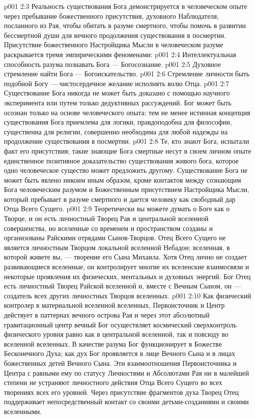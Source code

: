 \vs p001 2:3 \pc Реальность существования Бога демонстрируется в человеческом опыте через пребывание божественного присутствия, духовного Наблюдателя, посланного из Рая, чтобы обитать в разуме смертного, чтобы помочь в развитии бессмертной души для вечного продолжения существования в посмертии. Присутствие божественного Настройщика Мысли в человеческом разуме раскрывается тремя эмпирическими феноменами:
\vs p001 2:4 \bibnobreakspace Интеллектуальная способность разума познавать Бога --- Богосознание.
\vs p001 2:5 \bibnobreakspace Духовное стремление найти Бога --- Богоискательство.
\vs p001 2:6 \bibnobreakspace Стремление личности быть подобной Богу --- чистосердечное желание исполнять волю Отца.
\vs p001 2:7 \pc Существование Бога никогда не может быть доказано с помощью научного эксперимента или путем только дедуктивных рассуждений. Бог может быть осознан только на основе человеческого опыта; тем не менее истинная концепция существования Бога приемлема для логики, правдоподобна для философии, существенна для религии, совершенно необходима для любой надежды на продолжение существования в посмертии.
\vs p001 2:8 Те, кто знают Бога, испытали факт его присутствия; такие знающие Бога смертные несут в своем личном опыте единственное позитивное доказательство существования живого бога, которое одно человеческое существо может предложить другому. Существование Бога не может быть явлено никоим иным образом, кроме контактов между сознающим Бога человеческим разумом и Божественным присутствием Настройщика Мысли, который пребывает в разуме смертного и дается человеку как свободный дар Отца Всего Сущего.
\vs p001 2:9 \pc Теоретически вы можете думать о Боге как о Творце, и он есть личностный Творец Рая и центральной вселенной совершенства, но вселенные со временем и пространством созданы и организованы Райскими отрядами Сынов\hyp{}Творцов. Отец Всего Сущего не является личностным Творцом локальной вселенной Небадон; вселенная, в которой живете вы, --- творение его Сына Михаила. Хотя Отец лично не создает развивающиеся вселенные, он контролирует многие их вселенские взаимосвязи и некоторые проявления их физических, ментальных и духовных энергий. Бог Отец есть личностный Творец Райской вселенной и, вместе с Вечным Сыном, он --- создатель всех других личностных Творцов вселенных.
\vs p001 2:10 \pc Как физический контролер в материальной вселенной вселенных, Первоисточник и Центр действует в паттернах вечного острова Рая и через этот абсолютный гравитационный центр вечный Бог осуществляет космический сверхконтроль физического уровня равно как в центральной вселенной, так и повсюду во вселенной вселенных. В качестве разума Бог функционирует в Божестве Бесконечного Духа; как дух Бог проявляется в лице Вечного Сына и в лицах божественных детей Вечного Сына. Эти взаимоотношения Первоисточника и Центра с равными ему по статусу Личностями и Абсолютами Рая ни в малейшей степени не устраняют  личностного действия Отца Всего Сущего во всех творениях всех его уровней. Через присутствие фрагментов духа Творец Отец поддерживает непосредственный контакт со своими детьми\hyp{}созданиями и своими вселенными.
